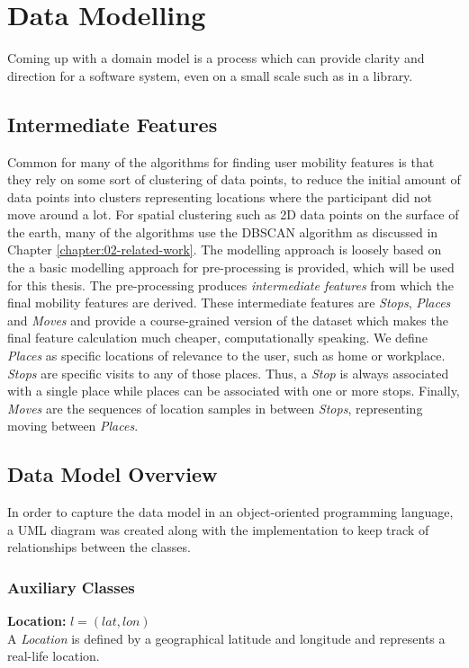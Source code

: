 \section{Data Modelling}
Coming up with a domain model is a process which can provide clarity and direction for a software system, even on a small scale such as in a library. 

\subsection{Intermediate Features}
Common for many of the algorithms for finding user mobility features is that they rely on some sort of clustering of data points, to reduce the initial amount of data points into clusters representing locations where the participant did not move around a lot. For spatial clustering such as 2D data points on the surface of the earth, many of the algorithms use the DBSCAN algorithm as discussed in Chapter \ref{chapter:02-related-work}. The modelling approach is loosely based on the \cite{sparse-location-2014} a basic modelling approach for pre-processing is provided, which will be used for this thesis. The pre-processing produces \textit{intermediate features} from which the final mobility features are derived. These intermediate features are \textit{Stops}, \textit{Places} and \textit{Moves} and provide a course-grained version of the dataset which makes the final feature calculation much cheaper, computationally speaking. We define \textit{Places} as specific locations of relevance to the user, such as home or workplace. \textit{Stops} are specific visits to any of those places. Thus, a \textit{Stop} is always associated with a single place while places can be associated with one or more stops. Finally, \textit{Moves} are the sequences of location samples in between \textit{Stops}, representing moving between \textit{Places}. 

\subsection{Data Model Overview}
In order to capture the data model in an object-oriented programming language, a UML diagram was created along with the implementation to keep track of relationships between the classes. 

\subsubsection*{Auxiliary Classes}
\textbf{Location:} $l = (lat, lon)$ \\ 
A \textit{Location} is defined by a geographical latitude and longitude and represents a real-life location.\\

